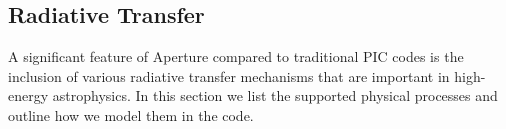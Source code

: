 


\subsection{Radiative Transfer}
\label{sec:radiative-transfer}

A significant feature of Aperture compared to traditional PIC codes is the
inclusion of various radiative transfer mechanisms that are important in
high-energy astrophysics. In this section we list the supported physical
processes and outline how we model them in the code.

